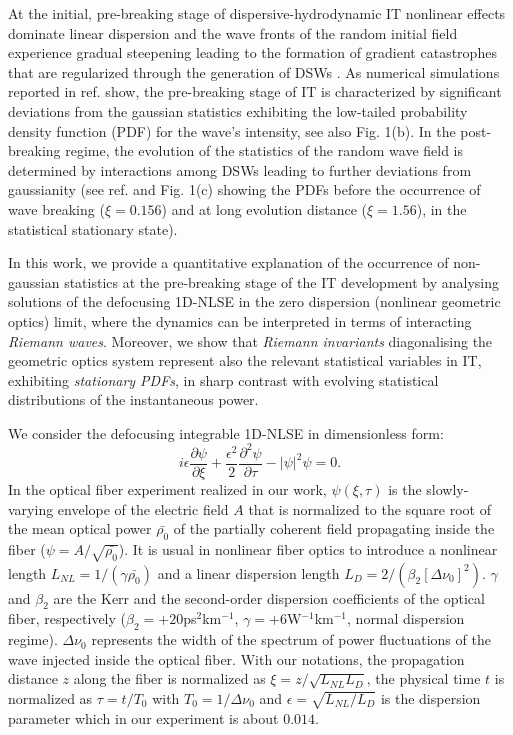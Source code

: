 \documentclass[twocolumn,preprintnumbers,amsmath,amssymb,superscriptaddress]{revtex4}
\begin{document}
At the initial, pre-breaking stage of dispersive-hydrodynamic IT
nonlinear effects dominate linear dispersion and the wave fronts of
the random initial field experience gradual  steepening leading to the
formation of gradient catastrophes that are  regularized  through the
generation of  DSWs \cite{el:2016}.  As  numerical simulations
reported in ref. \cite{Randoux:16b} show, the pre-breaking stage of IT
is characterized by significant  deviations from the gaussian
statistics  exhibiting the  low-tailed probability density function
(PDF) for the wave's intensity, see also Fig. 1(b).  In the post-breaking regime, the
evolution of the statistics of the random wave field is determined by
interactions among DSWs leading to further deviations from gaussianity
(see ref. \cite{Randoux:16b} and Fig. 1(c) showing the PDFs 
before the occurrence of wave breaking ($\xi=0.156$) and at long 
evolution distance ($\xi=1.56$), in the statistical stationary state).


In this work, we provide a quantitative explanation of the occurrence
of non-gaussian statistics at the pre-breaking stage of the  IT
development  by analysing solutions of  the defocusing 1D-NLSE in the
zero dispersion (nonlinear geometric optics) limit, where the dynamics can be
interpreted in terms of interacting {\it Riemann waves}.  Moreover, we
show that {\it Riemann invariants} diagonalising the geometric optics
system  represent also the relevant  statistical variables  in IT,
exhibiting {\it stationary PDFs}, in sharp contrast  with evolving
statistical distributions of the instantaneous power.

We consider the defocusing integrable 1D-NLSE
in dimensionless form:
\begin{equation}\label{nlse}
i \epsilon \frac{\partial \psi}{\partial \xi} + \frac{\epsilon^2}{2}
\frac{\partial^2 \psi}{\partial \tau} -|\psi|^2 \psi=0.
\end{equation}
In the optical fiber experiment realized in our work, 
$\psi(\xi,\tau)$ is the slowly-varying envelope of
the electric field $A$ that  is normalized to the square root of the
mean optical power $\bar{\rho_0}$ of the partially  coherent field
propagating inside the fiber ($\psi=A/\sqrt{\bar{\rho_0}}$). It is usual  in
nonlinear fiber optics to introduce a nonlinear length
$L_{NL}=1/(\gamma \bar{\rho_0})$ and a linear  dispersion length
$L_D=2/(\beta_2 [\Delta \nu_0]^2)$. $\gamma$ and $\beta_2$ are the Kerr
and the second-order dispersion
coefficients of the optical fiber, respectively  ($\beta_2=+20$ps$^2$km$^{-1}$,
$\gamma=+6$W$^{-1}$km$^{-1}$,  normal dispersion regime).  $\Delta
\nu_0$ represents the width of the spectrum of power fluctuations of
the wave injected inside the optical
fiber. With our notations, the propagation distance $z$ along the
fiber is normalized as $\xi=z/\sqrt{L_{NL}L_D}$, the physical time $t$
is normalized as $\tau=t/T_0$ with $T_0=1/\Delta \nu_0$ and
$\epsilon=\sqrt{L_{NL}/L_D}$ is the dispersion parameter which in our experiment is about $0.014$.
\end{document}
